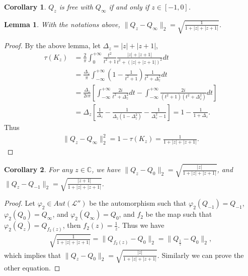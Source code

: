 \documentclass{amsart}
\newcommand{\LLL}{\mathcal L} %
\newcommand{\C}{\mathbb C} %
\newtheorem{corollary}{Corollary}[section]
\newtheorem{lemma}{Lemma}[section]
\begin{document}
\begin{corollary}
$Q_z$ is free with $Q_{\infty}$ if and only if $z \in [-1,0]$.
\end{corollary}

\begin{lemma}
With the notations above, $\parallel Q_{z} - Q_{\infty} \parallel_{2} = \sqrt{\frac{1}{1+ |z|+|z+1|}}$.
\end{lemma}

\begin{proof}
By the above lemma, let $\Delta_{z} = |z|+|z+1|$,
\begin{align*}
\tau(K_z) &= \frac{2}{\pi}\int^{+\infty}_{0} \frac{t^2}{t^2+1}\frac{|z|+|z+1|}{t^2 + (|z|+|z+1|)^2}dt \\
          &= \frac{\Delta_z}{\pi}\int^{+\infty}_{-\infty} (1 - \frac{1}{t^2+1})\frac{1}{t^2 + \Delta_{z}^2}dt\\
          &= \frac{\Delta_z}{2i\pi}[\int^{+\infty}_{-\infty} \frac{2i}{t^2 + \Delta_{z}^2}dt - \int^{+\infty}_{-\infty} \frac{2i}{(t^2+1)(t^2 + \Delta_{z}^2)}dt]\\
          &= \Delta_z[\frac{1}{\Delta_z} -\frac{1}{\Delta_{z}(1-\Delta_{z}^2)} - \frac{1}{\Delta_{z}^2 - 1}] = 1- \frac{1}{1+ \Delta_{z}}.
\end{align*}
Thus
\begin{align*}
\parallel Q_{z} - Q_{\infty} \parallel_{2}^{2} = 1 - \tau(K_z) =  \frac{1}{1+ |z|+|z+1|}.
\end{align*}
\end{proof}

\begin{corollary}
For any $z \in \C$, we have $\parallel Q_{z} - Q_{0} \parallel_{2} = \sqrt{\frac{|z|}{1+ |z|+|z+1|}}$, and
$\parallel Q_{z} - Q_{-1} \parallel_{2} = \sqrt{\frac{|z+1|}{1+ |z|+|z+1|}}$.
\end{corollary}

\begin{proof}
Let $\varphi_{2} \in Aut(\LLL'')$ be the automorphism such that $\varphi_{2}(Q_{-1}) = Q_{-1}$, $\varphi_{2}(Q_{0}) = Q_{\infty}$,
and $\varphi_{2}(Q_{\infty}) = Q_{0}$, and $f_2$ be the map such that $\varphi_{2}(Q_{z}) = Q_{f_{2}(z)}$, then $f_{2}(z) = \frac{1}{z}$.
Thus we have
\begin{align*}
\sqrt{\frac{1}{1+ |z|+|z+1|}} = \parallel Q_{f_2(z)} - Q_{0} \parallel_{2} = \parallel Q_{\frac{1}{z}} - Q_{0} \parallel_{2},
\end{align*}
which implies that $\parallel Q_{z} - Q_{0} \parallel_{2} = \sqrt{\frac{|z|}{1+ |z|+|z+1|}}$. Similarly we can prove the other equation.
\end{proof}
\end{document}
